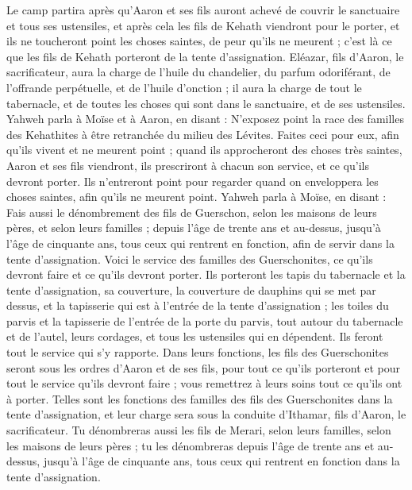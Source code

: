 \begin{multicols}{2}
Le camp partira après qu'Aaron et ses fils auront achevé de couvrir le sanctuaire et tous ses ustensiles, et après cela les fils de Kehath viendront pour le porter, et ils ne toucheront point les choses saintes, de peur qu'ils ne meurent ; c'est là ce que les fils de Kehath porteront de la tente d'assignation.
Eléazar, fils d'Aaron, le sacrificateur, aura la charge de l'huile du chandelier, du parfum odoriférant, de l’offrande perpétuelle, et de l'huile d'onction ; il aura la charge de tout le tabernacle, et de toutes les choses qui sont dans le sanctuaire, et de ses ustensiles.
Yahweh parla à Moïse et à Aaron, en disant :
N’exposez point la race des familles des Kehathites à être retranchée du milieu des Lévites.
Faites ceci pour eux, afin qu'ils vivent et ne meurent point ; quand ils approcheront des choses très saintes, Aaron et ses fils viendront, ils prescriront à chacun son service, et ce qu'ils devront porter.
Ils n'entreront point pour regarder quand on enveloppera les choses saintes, afin qu'ils ne meurent point.
Yahweh parla à Moïse, en disant :
Fais aussi le dénombrement des fils de Guerschon, selon les maisons de leurs pères, et selon leurs familles ;
depuis l'âge de trente ans et au-dessus, jusqu'à l'âge de cinquante ans, tous ceux qui rentrent en fonction, afin de servir dans la tente d'assignation.
Voici le service des familles des Guerschonites, ce qu’ils devront faire et ce qu’ils devront porter.
Ils porteront les tapis du tabernacle et la tente d'assignation, sa couverture, la couverture de dauphins qui se met par dessus, et la tapisserie qui est à l'entrée de la tente d'assignation ;
les toiles du parvis et la tapisserie de l'entrée de la porte du parvis, tout autour du tabernacle et de l’autel, leurs cordages, et tous les ustensiles qui en dépendent. Ils feront tout le service qui s’y rapporte.
Dans leurs fonctions, les fils des Guerschonites seront sous les ordres d'Aaron et de ses fils, pour tout ce qu’ils porteront et pour tout le service qu’ils devront faire ; vous remettrez à leurs soins tout ce qu’ils ont à porter.
Telles sont les fonctions des familles des fils des Guerschonites dans la tente d'assignation, et leur charge sera sous la conduite d'Ithamar, fils d'Aaron, le sacrificateur.
Tu dénombreras aussi les fils de Merari, selon leurs familles, selon les maisons de leurs pères ;
tu les dénombreras depuis l'âge de trente ans et au-dessus, jusqu'à l'âge de cinquante ans, tous ceux qui rentrent en fonction dans la tente d'assignation.

\end{multicols}
